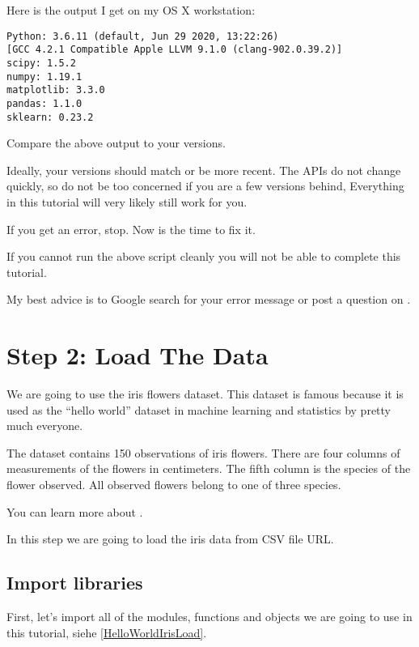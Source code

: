 Here is the output I get on my OS X workstation:

\begin{lstlisting}
Python: 3.6.11 (default, Jun 29 2020, 13:22:26) 
[GCC 4.2.1 Compatible Apple LLVM 9.1.0 (clang-902.0.39.2)]
scipy: 1.5.2
numpy: 1.19.1
matplotlib: 3.3.0
pandas: 1.1.0
sklearn: 0.23.2
\end{lstlisting}

\medskip

Compare the above output to your versions.

Ideally, your versions should match or be more recent. The APIs do not change quickly, so do not be too concerned if you are a few versions behind, Everything in this tutorial will very likely still work for you.

If you get an error, stop. Now is the time to fix it.

If you cannot run the above script cleanly you will not be able to complete this tutorial.

My best advice is to Google search for your error message or post a question on .    
     
     
     
\section{Step 2: Load The Data}

We are going to use the iris flowers dataset. This dataset is famous because it is used as the “hello world” dataset in machine learning and statistics by pretty much everyone.
    
The dataset contains 150 observations of iris flowers. There are four columns of measurements of the flowers in centimeters. The fifth column is the species of the flower observed. All observed flowers belong to one of three species.
    
You can learn more about .
    
In this step we are going to load the iris data from CSV file URL.
    
\subsection{Import libraries}

First, let's import all of the modules, functions and objects we are going to use in this tutorial, siehe \ref{HelloWorldIrisLoad}.

